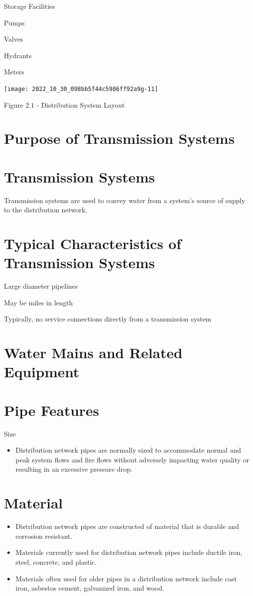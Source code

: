 \documentclass[10pt]{article}
\begin{document}
Storage Facilities

Pumps

Valves

Hydrants

Meters

\texttt{[image: 2022\_10\_30\_098bb5f44c5986ff92a9g-11]}

Figure $2.1$ - Distribution System Layout

\section{Purpose of Transmission Systems}
\section{Transmission Systems}
Transmission systems are used to convey water from a system's source of supply to the distribution network.

\section{Typical Characteristics of Transmission Systems}
Large diameter pipelines

May be miles in length

Typically, no service connections directly from a transmission system

\section{Water Mains and Related Equipment}
\section{Pipe Features}
Size

\begin{itemize}
  \item Distribution network pipes are normally sized to accommodate normal and peak system flows and fire flows without adversely impacting water quality or resulting in an excessive pressure drop.
\end{itemize}
\section{Material}
\begin{itemize}
  \item Distribution network pipes are constructed of material that is durable and corrosion resistant.

  \item Materials currently used for distribution network pipes include ductile iron, steel, concrete, and plastic.

  \item Materials often used for older pipes in a distribution network include cast iron, asbestos cement, galvanized iron, and wood.

\end{itemize}
\end{document}
